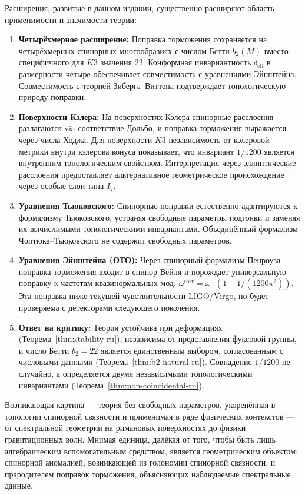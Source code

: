 \documentclass[12pt,a4paper]{article}
\theoremstyle{definition}
\theoremstyle{remark}
\begin{document}
Расширения, развитые в данном издании, существенно расширяют область применимости и значимости теории:

\begin{enumerate}
\item \textbf{Четырёхмерное расширение:} Поправка торможения сохраняется на четырёхмерных спинорных многообразиях с числом Бетти $b_2(M)$ вместо специфичного для $K3$ значения $22$. Конформная инвариантность $\delta_{\mathrm{eff}}$ в размерности четыре обеспечивает совместимость с уравнениями Эйнштейна. Совместимость с теорией Зиберга--Виттена подтверждает топологическую природу поправки.

\item \textbf{Поверхности Кэлера:} На поверхностях Кэлера спинорные расслоения разлагаются via соответствие Дольбо, и поправка торможения выражается через числа Ходжа. Для поверхности $K3$ независимость от кэлеровой метрики внутри кэлерова конуса показывает, что инвариант $1/1200$ является внутренним топологическим свойством. Интерпретация через эллиптические расслоения предоставляет альтернативное геометрическое происхождение через особые слои типа $I_7$.

\item \textbf{Уравнения Тьюковского:} Спинорные поправки естественно адаптируются к формализму Тьюковского, устраняя свободные параметры подгонки и заменяя их вычислимыми топологическими инвариантами. Объединённый формализм Чоптюка--Тьюковского не содержит свободных параметров.

\item \textbf{Уравнения Эйнштейна (ОТО):} Через спинорный формализм Пенроуза поправка торможения входит в спинор Вейля и порождает универсальную поправку к частотам квазинормальных мод: $\omega^{\mathrm{corr}} = \omega \cdot (1 - 1/(1200\pi^2))$. Эта поправка ниже текущей чувствительности LIGO/Virgo, но будет проверяема с детекторами следующего поколения.

\item \textbf{Ответ на критику:} Теория устойчива при деформациях (Теорема~\ref{thm:stability-ru}), независима от представления фуксовой группы, и число Бетти $b_2 = 22$ является единственным выбором, согласованным с числовыми данными (Теорема~\ref{thm:b2-natural-ru}). Совпадение $1/1200$ не случайно, а определяется двумя независимыми топологическими инвариантами (Теорема~\ref{thm:non-coincidental-ru}).
\end{enumerate}

Возникающая картина --- теория без свободных параметров, укоренённая в топологии спинорной связности и применимая в ряде физических контекстов --- от спектральной геометрии на римановых поверхностях до физики гравитационных волн. Мнимая единица, далёкая от того, чтобы быть лишь алгебраическим вспомогательным средством, является геометрическим объектом: спинорной аномалией, возникающей из голономии спинорной связности, и прародителем поправок торможения, объясняющих наблюдаемые спектральные данные.
\end{document}
